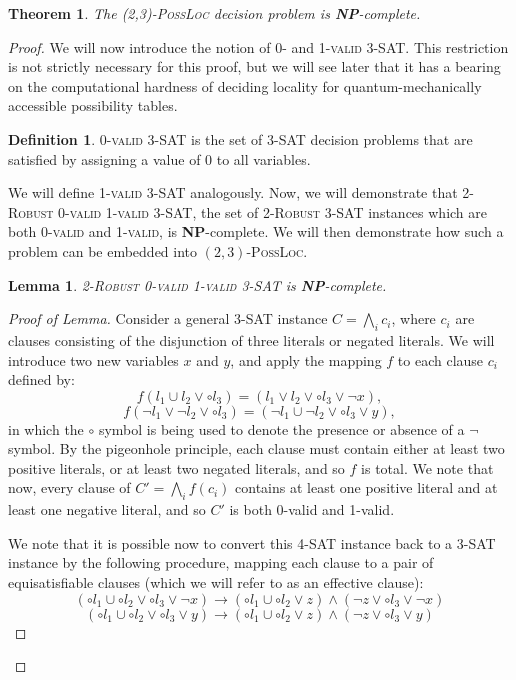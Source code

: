 \documentclass[reprint]{revtex4-1}
\newtheorem{thm}{Theorem}
\newtheorem{lem}{Lemma}
\theoremstyle{definition}
\newtheorem{defn}{Definition}
\begin{document}
\begin{thm}
The \textsc{(2,3)-PossLoc} decision problem is \textbf{NP}-complete.
\end{thm}
\begin{proof}
We will now introduce the notion of 0- and \textsc{1-valid 3-SAT}. This restriction is not strictly necessary for  this proof, but we will see later that it has a bearing on the computational hardness of deciding locality for quantum-mechanically accessible possibility tables.
\begin{defn}
\textsc{0-valid 3-SAT} is the set of \textsc{3-SAT} decision problems that are satisfied by assigning a value of 0 to all variables.
\end{defn}
We will define \textsc{1-valid 3-SAT} analogously. Now, we will demonstrate that \textsc{2-Robust 0-valid 1-valid 3-SAT}, the set of \textsc{2-Robust 3-SAT} instances which are both \textsc{0-valid} and \textsc{1-valid}, is \textbf{NP}-complete. We will then demonstrate how such a problem can be embedded into $(2,3)$-\textsc{PossLoc}.
\begin{lem}\label{rob3sat}
\textsc{2-Robust 0-valid 1-valid 3-SAT} is \textbf{NP}-complete.
\end{lem}
\begin{proof}[Proof of Lemma]
Consider a general \textsc{3-SAT} instance $C=\bigwedge_i c_i$, where $c_i$ are clauses consisting of the disjunction of three literals or negated literals. We will introduce two new variables $x$ and $y$, and apply the mapping $f$ to each clause $c_i$ defined by:
\begin{equation}
f(l_1\cup l_2 \vee  \circ  l_3) = (l_1\vee l_2 \vee \circ l_3 \vee \neg x),
\end{equation}
\begin{equation}
f(\neg l_1\vee\neg l_2 \vee \circ  l_3) = (\neg l_1\cup\neg l_2 \vee \circ  l_3 \vee  y),
\end{equation}
in which the $\circ$ symbol is being used to denote the presence or absence of a $\neg$ symbol. By the pigeonhole principle, each clause must contain either at least two positive literals, or at least two negated literals, and so $f$ is total. We note that now, every clause of $C'=\bigwedge_i f(c_i)$ contains at least one positive literal and at least one negative literal, and so $C'$ is both 0-valid and 1-valid.

We note that it is possible now to convert this 4-SAT instance back to a \textsc{3-SAT} instance by the following procedure, mapping each clause to a pair of equisatisfiable clauses (which we will refer to as an effective clause):
\begin{equation}
(\circ l_1\cup\circ l_2 \vee  \circ  l_3 \vee \neg x) \rightarrow (\circ l_1\cup\circ l_2 \vee z)\wedge(\neg z \vee \circ  l_3 \vee\neg x)
\end{equation}
\begin{equation}
(\circ l_1\cup\circ l_2 \vee  \circ  l_3 \vee y) \rightarrow (\circ l_1\cup\circ l_2 \vee z)\wedge(\neg z \vee \circ  l_3 \vee y)
\end{equation}


\end{proof}
\end{proof}
\end{document}
